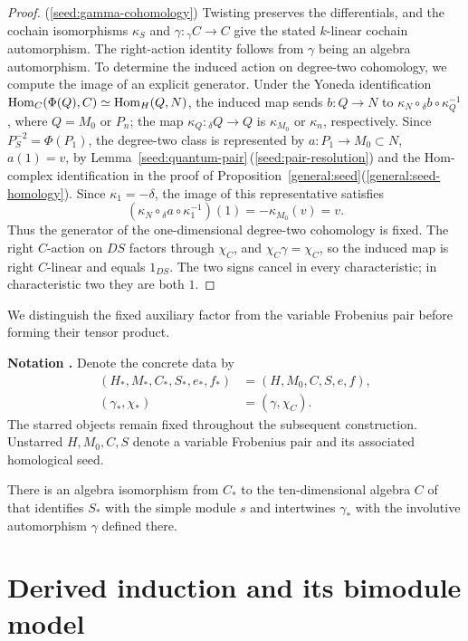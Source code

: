 \documentclass[11pt]{article}
\begin{document}
\begin{proof}
\textup{(\ref{seed:gamma-cohomology})} Twisting preserves the differentials, and the cochain
isomorphisms $\kappa_S$ and $\gamma:{}_\gamma C\to C$ give the stated
$k$-linear cochain automorphism. The right-action identity follows
from $\gamma$ being an algebra automorphism. To determine the induced
action on degree-two cohomology, we compute the image of an explicit generator.
Under the Yoneda identification ${\rm Hom}_C(\Phi(Q),C)\simeq{\rm Hom}_H(Q,N)$, the induced map
sends $b:Q\to N$ to $\kappa_N\circ{}_\delta b\circ\kappa_Q^{-1}$, where  $Q=M_0$ or $P_n$; the map $\kappa_Q:{}_\delta Q\to Q$ is $\kappa_{M_0}$ or $\kappa_n$, respectively. Since
$P_S^{-2}=\Phi(P_1)$, the degree-two class is represented by
$a:P_1\to M_0\subset N$, $a(1)=v$, by
Lemma~\ref{seed:quantum-pair}\,\textup{(\ref{seed:pair-resolution})}
and the Hom-complex identification in the proof of
Proposition~\ref{general:seed}\textup{(\ref{general:seed-homology})}.
Since $\kappa_1=-\delta$, the image of this representative satisfies
\[
 (\kappa_N\circ{}_\delta a\circ\kappa_1^{-1})(1)
       =-\kappa_{M_0}(v)=v.
\]
Thus the generator of the one-dimensional degree-two cohomology
is fixed. The right $C$-action on $DS$ factors through $\chi_C$, and
$\chi_C\gamma=\chi_C$, so the induced map is right $C$-linear
and equals $1_{DS}$. The two signs cancel in every characteristic;
in characteristic two they are both $1$.
\end{proof}

We distinguish the fixed auxiliary factor from the variable Frobenius
pair before forming their tensor product.

\par\medskip{}\noindent\textbf{Notation \theTheo.}\label{seed:auxiliary-notation}
Denote the concrete data by
\[
 \begin{aligned}
 (H_*,M_*,C_*,S_*,e_*,f_*)&=(H,M_0,C,S,e,f),\\
 (\gamma_*,\chi_*)&=(\gamma,\chi_C).
 \end{aligned}
\]
The starred objects remain fixed throughout the subsequent
construction.  Unstarred $H,M_0,C,S$ denote a variable Frobenius
pair and its associated homological seed.
\par\medskip

There is an algebra isomorphism from $C_*$ to the ten-dimensional
algebra $C$ of \cite[Section~3]{F} that identifies $S_*$ with the
simple module $s$ and intertwines $\gamma_*$ with the involutive
automorphism $\gamma$ defined there.

\section{Derived induction and its bimodule model}
\label{ind:section}
\end{document}
